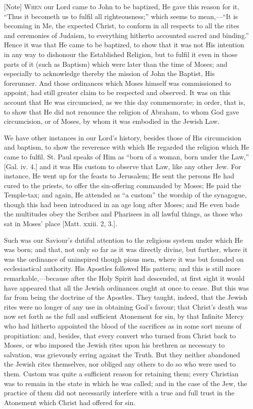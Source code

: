 [Note] W\textsc{hen} our Lord came to
John to be baptized, He gave this reason for it, ``Thus it
becometh us to fulfil all righteousness;'' which seems to mean,—``It
is becoming in Me, the expected Christ, to conform in all respects to
all the rites and ceremonies of Judaism, to everything hitherto
accounted sacred and binding.'' Hence it was that He came to be
baptized, to show that it was not His intention in any way to
dishonour the Established Religion, but to fulfil it even in those
parts of it (such as Baptism) which were later than the time of Moses;
and especially to acknowledge thereby the mission of John the Baptist,
His forerunner. And those ordinances which Moses himself was
commissioned to appoint, had still greater claim to be respected and
observed. It was on this account that He was circumcised, as we this
day commemorate; in order, that is, to show that He did not renounce
the religion of Abraham, to whom God gave circumcision, or of Moses,
by whom it was embodied in the Jewish Law.

We have other instances in our Lord's history, besides those of His
circumcision and baptism, to show the reverence with which He regarded
the religion which He came to fulfil. St. Paul speaks of Him as
``born of a woman, born under the Law,'' [Gal. iv. 4.] and it
was His custom to observe that Law, like any other Jew. For instance,
He went up for the feasts to Jerusalem; He sent the persons He had
cured to the priests, to offer the sin-offering commanded by Moses; He
paid the Temple-tax; and again, He attended as ``a custom''
the worship of the synagogue, though this had been introduced in an
age long after Moses; and He even bade the multitudes obey the Scribes
and Pharisees in all lawful things, as those who sat in Moses' place
[Matt. xxiii. 2, 3.].

Such was our Saviour's dutiful attention to the religious system
under which He was born; and that, not only so far as it was directly
divine, but further, where it was the ordinance of uninspired though
pious men, where it was but founded on ecclesiastical authority. His
Apostles followed His pattern; and this is still more remarkable,—because
after the Holy Spirit had descended, at first sight it would have
appeared that all the Jewish ordinances ought at once to cease. But
this was far from being the doctrine of the Apostles. They taught,
indeed, that the Jewish rites were no longer of any use in obtaining
God's favour; that Christ's death was now set forth as the full and
sufficient Atonement for sin, by that Infinite Mercy who had hitherto
appointed the blood of the sacrifices as in some sort means of
propitiation: and, besides, that every convert who turned from Christ
back to Moses, or who imposed the Jewish rites upon his brethren as
necessary to salvation, was grievously erring against the Truth. But
they neither abandoned the Jewish rites themselves, nor obliged any
others to do so who were used to them. Custom was quite a sufficient
reason for retaining them; every Christian was to remain in the state
in which he was called; and in the case of the Jew, the practice of
them did not necessarily interfere with a true and full trust in the
Atonement which Christ had offered for sin.

